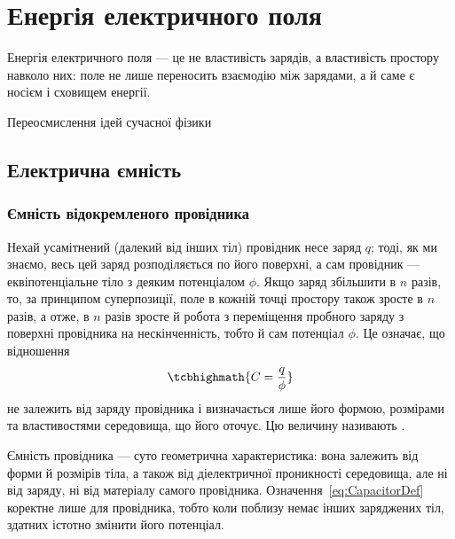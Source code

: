 
\chapter{Енергія електричного поля}\label{\currfilebase}
\graphicspath{{\currfilebase/Pictures}}
\epigraph{Енергія електричного поля --- це не властивість зарядів, а властивість простору навколо них: поле не лише переносить взаємодію між
	зарядами, а й саме є носієм і сховищем енергії.
}{Переосмислення ідей сучасної фізики}


\section{Електрична ємність}

\subsection*{Ємність відокремленого провідника}

Нехай усамітнений (далекий від інших тіл) провідник несе заряд $q$; тоді, як ми знаємо, весь цей заряд розподіляється по його поверхні, а сам
провідник --- еквіпотенціальне тіло з деяким потенціалом $\phi$. Якщо заряд збільшити в $n$ разів, то, за принципом суперпозиції, поле в кожній точці
простору також зросте в $n$ разів, а отже, в $n$ разів зросте й робота з переміщення пробного заряду з поверхні провідника на нескінченність, тобто й
сам потенціал $\phi$. Це означає, що відношення
\begin{equation}\label{eq:CapacitorDef}
	\tcbhighmath{
		C = \frac{q}{\phi}
	}
\end{equation}
не залежить від заряду провідника і визначається лише його формою, розмірами та властивостями середовища, що його оточує. Цю величину називають
.

\begin{Attention}
	Ємність провідника --- суто геометрична характеристика: вона залежить від форми й розмірів тіла, а також від діелектричної проникності
	середовища, але  ні від заряду, ні від матеріалу самого провідника. Означення~\eqref{eq:CapacitorDef} коректне лише для
	 провідника, тобто коли поблизу немає інших заряджених тіл, здатних істотно змінити його потенціал.
\end{Attention}

